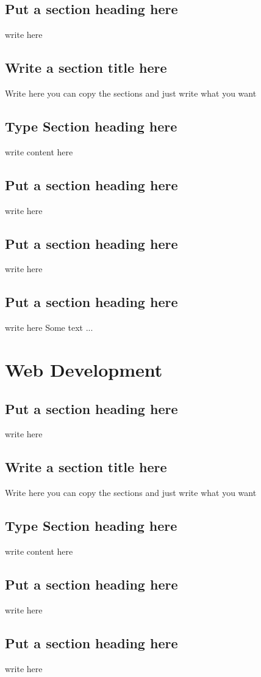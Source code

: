 \documentclass[a4paper,twoside]{scrbook}
\begin{document}
\section{Put a section heading here}
write here
\section{Write a section title here}
Write here you can copy the sections and just write what you want
\section{Type Section heading here}
write content here
\section{Put a section heading here}
write here
\section{Put a section heading here}
write here
\section{Put a section heading here}
write here
Some text ...
\chapter{Web Development}\label{ch14}
\section{Put a section heading here}
write here
\section{Write a section title here}
Write here you can copy the sections and just write what you want
\section{Type Section heading here}
write content here
\section{Put a section heading here}
write here
\section{Put a section heading here}
write here
\end{document}
